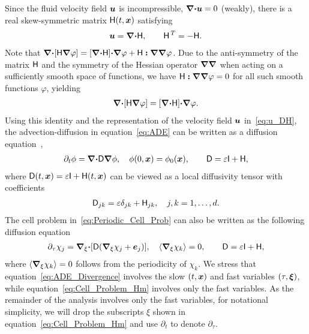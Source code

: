 \documentclass[amsa]{ipart}
\begin{document}
Since the fluid velocity field $\boldsymbol{u}$ is incompressible,
$\mbox{\boldmath${\nabla}$}\mbox{\boldmath${\cdot}$}\boldsymbol{u}=0$ (weakly), there is a 
real skew-symmetric matrix $\mathsf{H}(t,\boldsymbol{x})$
satisfying~\cite{Avellaneda:PRL-753,Avellaneda:CMP-339}   
% 
\begin{align}\label{eq:u_DH}
 \vecu=\bnabla\bcdot\Hm, \qquad   \Hm^{\,T}=-\Hm.
\end{align}
% 
Note that
$\mbox{\boldmath${\nabla}$}\mbox{\boldmath${\cdot}$}[\mathsf{H}\mbox{\boldmath${\nabla}$}\varphi]=[\mbox{\boldmath${\nabla}$}\mbox{\boldmath${\cdot}$}\mathsf{H}]\mbox{\boldmath${\cdot}$}\mbox{\boldmath${\nabla}$}\varphi+\mathsf{H}\boldsymbol{:}\mbox{\boldmath${\nabla}$}\mbox{\boldmath${\nabla}$}\varphi$. Due
to the anti-symmetry of the matrix $\mathsf{H}$ and the symmetry of the Hessian
operator $\mbox{\boldmath${\nabla}$}\mbox{\boldmath${\nabla}$}$ when acting on a sufficiently smooth space
of functions, we have $\mathsf{H}\boldsymbol{:}\mbox{\boldmath${\nabla}$}\mbox{\boldmath${\nabla}$}\varphi=0$ for all such
smooth functions $\varphi$, yielding
%
\begin{align}\label{eq:H:Hessian_identity}
  \bnabla\bcdot[\Hm\bnabla\varphi]=[\bnabla\bcdot\Hm]\bcdot\bnabla\varphi.
\end{align}
%
Using this identity and the
representation of the velocity field $\boldsymbol{u}$ in~\eqref{eq:u_DH}, the
advection-diffusion in equation~\eqref{eq:ADE} can be written as a
diffusion
equation~\cite{Fannjiang:1994:SIAM_JAM:333,Novikov:2005:CPAM:867},     
%
\begin{align}\label{eq:ADE_Divergence}
  \partial_t\phi%
    =\bnabla \bcdot\Dm\bnabla \phi, \quad
    \phi(0,\vecx)=\phi_0(\vecx),
    \qquad
    \Dm=\varepsilon\Ib+\Hm,
\end{align}
%
where $\mathsf{D}(t,\boldsymbol{x})=\varepsilon\mathsf{I}+\mathsf{H}(t,\boldsymbol{x})$ can be viewed as a local
diffusivity tensor with coefficients
%
\begin{align}\label{eq:kappa_coeff}
  \Dm_{jk}=\varepsilon\delta_{jk}+\Hm_{jk},\quad j,k=1,\ldots,d.
\end{align}
%
The cell problem in~\eqref{eq:Periodic_Cell_Prob} can also be
written as the following diffusion
equation~\cite{Fannjiang:1994:SIAM_JAM:333,Novikov:2005:CPAM:867}     
% 
\begin{align}\label{eq:Cell_Problem_Hm}
  \partial_\tau\chi_j=\bnabla_\xi \bcdot[\Dm(\bnabla_\xi \chi_j+\vece_j)],
  \quad
  \langle\bnabla_\xi \chi_k\rangle=0, \qquad
  \Dm=\varepsilon\Ib+\Hm,
\end{align}
%
where $\langle\mbox{\boldmath${\nabla}$}_\xi \chi_k\rangle=0$ follows from the periodicity of $\chi_k$. We
stress that equation~\eqref{eq:ADE_Divergence} involves the slow
$(t,\boldsymbol{x})$ and fast variables $(\tau,\boldsymbol{\xi})$, while
equation~\eqref{eq:Cell_Problem_Hm} involves only the fast variables. 
As the remainder of the analysis involves only the fast variables, for
notational simplicity, we will drop the subscripts $\xi$ shown in
equation~\eqref{eq:Cell_Problem_Hm} and use $\partial_t$ to denote $\partial_\tau$.  
\end{document}
